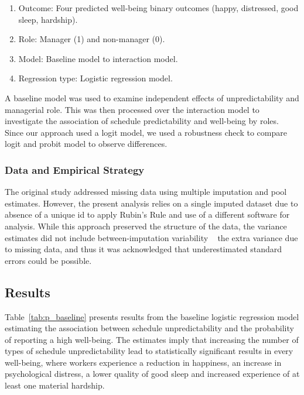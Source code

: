 \documentclass{article}
\begin{document}
	\begin{enumerate}
		\item Outcome: Four predicted well-being binary outcomes (happy, distressed, good sleep, hardship).
		\item Role: Manager (1) and non-manager (0).
		\item Model: Baseline model to interaction model.
		\item Regression type: Logistic regression model.
	\end{enumerate}
	
	A baseline model was used to examine independent effects of unpredictability and managerial role. This was then processed over the interaction model to investigate the association of schedule predictability and well-being by roles. Since our approach used a logit model, we used a robustness check to compare logit and probit model to observe differences.
	
	\subsubsection{Data and Empirical Strategy}
	
	The original study addressed missing data using multiple imputation and pool estimates. However, the present analysis relies on a single imputed dataset due to absence of a unique id to apply Rubin's Rule and use of a different software for analysis. While this approach preserved the structure of the data, the variance estimates did not include between-imputation variability \textemdash~ the extra variance due to missing data, and thus it was acknowledged that underestimated standard errors could be possible.
	
	\subsection{Results}
	
	Table~\ref{tab:p_baseline} presents results from the baseline logistic regression model estimating the association between schedule unpredictability and the probability of reporting a high well-being. The estimates imply that increasing the number of types of schedule unpredictability lead to statistically significant results in every well-being, where workers experience a reduction in happiness, an increase in psychological distress, a lower quality of good sleep and increased experience of at least one material hardship.  
	
\end{document}
